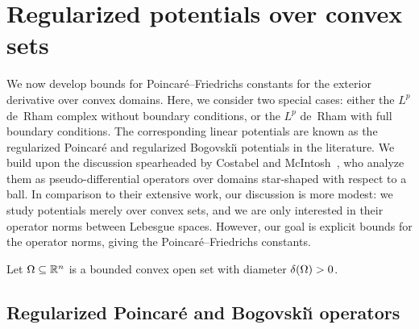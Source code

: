 \documentclass[10pt,a4paper]{article}
\newcommand{\todo}[1]{{\colorbox{yellow}{#1}}}
\newcommand{\mwl}[1]{{\color{red}#1}}
\begin{document}
\section{Regularized potentials over convex sets}\label{section:potentialoperator}



We now develop bounds for Poincar\'e--Friedrichs constants for the exterior derivative over convex domains.
Here, we consider two special cases: 
either the $L^{p}$ de~Rham complex without boundary conditions, or the $L^{p}$ de~Rham with full boundary conditions. 
The corresponding linear potentials are known as the regularized Poincar\'e and regularized Bogovski\u{\i} potentials in the literature. 
We build upon the discussion spearheaded by Costabel and McIntosh~\cite{costabel2010bogovskiui},
who analyze them as pseudo-differential operators over domains star-shaped with respect to a ball. 
% 
In comparison to their extensive work, our discussion is more modest:
we study potentials merely over convex sets, and we are only interested in their operator norms between Lebesgue spaces.
However, our goal is explicit bounds for the operator norms, giving the Poincar\'e--Friedrichs constants. 

Let $\Omega \subseteq {\mathbb R}^{n}$ is a bounded convex open set with diameter ${\delta}(\Omega) > 0$.









\subsection{Regularized Poincar\'e and Bogovski\u{\i} operators}
\end{document}
